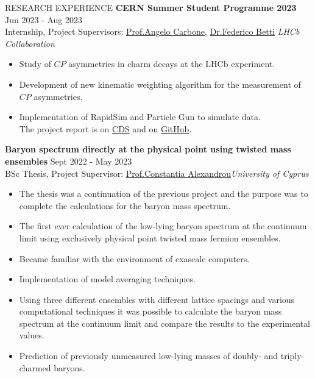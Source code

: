 \documentclass{resume} %
\begin{document}
        \begin{rSection}{RESEARCH EXPERIENCE}
                \textbf{CERN Summer Student Programme 2023} \hfill Jun 2023 - Aug 2023\\
                Internship, Project Supervisors: \href{https://www.unibo.it/sitoweb/angelo.carbone/en}{Prof.\@ Angelo Carbone}, \href{https://www.ph.ed.ac.uk/people/federico-betti}{Dr.\@ Federico Betti}
                \hfill \textit{LHCb Collaboration}
                \begin{itemize}
                        \itemsep -3pt {}
                        \item Study of $CP$ asymmetries in charm decays at the LHCb experiment.
                        \item Development of new kinematic weighting algorithm for the measurement of $CP$ asymmetries.
                        \item Implementation of RapidSim and Particle Gun to simulate data.\\ The project report is on \href{https://cds.cern.ch/record/2866568/}{CDS} and on \href{https://github.com/GiorgosChr/CERN_Summer_Student_Programme_2023}{GitHub}.
                \end{itemize}

                \textbf{Baryon spectrum directly at the physical point using twisted mass ensembles} \hfill Sept 2022 - May 2023\\
                BSc Thesis, Project Supervisor:  \href{https://www.cyi.ac.cy/index.php/castorc/about-the-center/castorc-our-people/itemlist/user/99-constantia-alexandrou.html}{Prof.\@ Constantia Alexandrou}\hfill \textit{University of Cyprus}
                \begin{itemize}
                        \itemsep -3pt {} 
                        \item The thesis was a continuation of the previous project and the purpose was to complete the calculations for the baryon mass spectrum.
                        \item The first ever calculation of the low-lying baryon spectrum at the continuum limit using exclusively physical point twisted mass fermion ensembles.
                        \item Became familiar with the environment of exascale computers.
                        \item Implementation of model averaging techniques.
                        \item Using three different ensembles with different lattice spacings and various computational techniques it was possible to calculate the baryon mass spectrum at the continuum limit and compare the results to the experimental values.
                        \item Prediction of previously unmeasured low-lying masses of doubly- and triply-charmed baryons.
                \end{itemize}


\end{rSection}
\end{document}
